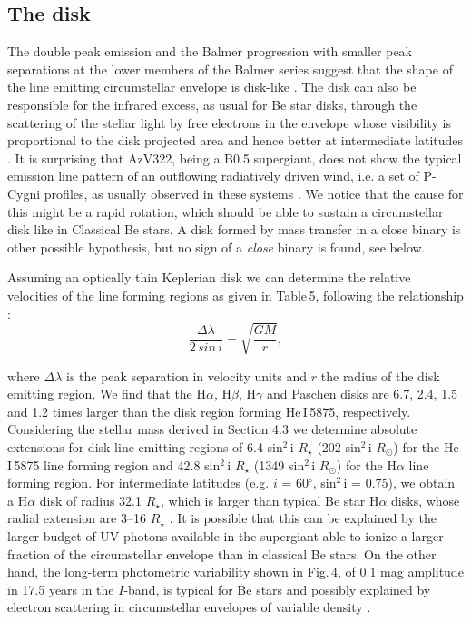 \documentclass[useAMS,usenatbib]{mn2e}
\def\dg{$^{\circ}$}
\def\rsun{$R_{\odot}$}
\begin{document}
\subsection{The disk}

The double peak emission and the Balmer progression with smaller peak separations at the lower members of the Balmer series suggest
that the shape of the line emitting circumstellar envelope is disk-like  \citep{2013A&ARv..21...69R}. The disk can also be responsible for the infrared excess, as usual for Be star disks, through the scattering of the stellar light by free electrons in the envelope  whose visibility is proportional to the disk projected area and hence better at intermediate latitudes
 \citep{1988A&A...194..167D}. It is surprising that AzV322, being a B0.5 supergiant, does not show the typical emission line pattern of an outflowing radiatively driven wind, i.e. a set of P-Cygni profiles, as usually observed in these systems \citep{2007A&A...463.1093L}. We  notice that the cause for this might be a rapid rotation, which should be able to sustain a circumstellar disk like in Classical Be stars.
 A disk formed by mass transfer in a close binary is other possible hypothesis, but no sign of a {\it close} binary is found, see below.
 
Assuming an optically thin Keplerian disk we can determine the relative velocities of the line forming regions as given in Table\,5, following the relationship \citep{1972ApJ...171..549H}:\\

\begin{equation}
 \frac{\Delta \lambda}{2\, sin\,i} = \sqrt{\frac{GM}{r}},
\end{equation}




\noindent
where $\Delta \lambda$ is the peak separation in velocity units and $r$ the radius of the disk emitting region.
 We find that the H$\alpha$, H$\beta$, H$\gamma$ and  Paschen disks are 6.7, 2.4, 1.5 and 1.2 times larger than the disk region forming He\,I\,5875, respectively. Considering the stellar mass derived in Section 4.3 we determine absolute extensions for disk line emitting regions of 6.4  sin$^{2}$\,i $R_{\star}$ (202 sin$^{2}$\,i  \rsun) for the He\,I\,5875 line forming region and 42.8  sin$^{2}$\,i $R_{\star}$ (1349 sin$^{2}$\,i \rsun) for the H$\alpha$ line forming region. For intermediate latitudes (e.g. $i$ = 60\dg, sin$^{2}$\,i = 0.75),  we obtain a H$\alpha$ disk of radius 32.1 $R_{\star}$, which is larger than typical Be star H$\alpha$ disks, whose radial extension are  3--16  $R_{\star}$ \citep{2013A&ARv..21...69R}. It is possible that this can be explained by the larger budget of UV photons available in the supergiant able to ionize a larger fraction of the circumstellar envelope than in classical Be stars. On the other hand,  the long-term photometric variability shown in Fig.\,4, of  0.1 mag amplitude in 17.5 years in the $I$-band,  is typical for Be stars and  possibly explained by electron scattering in circumstellar envelopes of variable density \citep{1990A&A...230..380D}.
 
\end{document}

